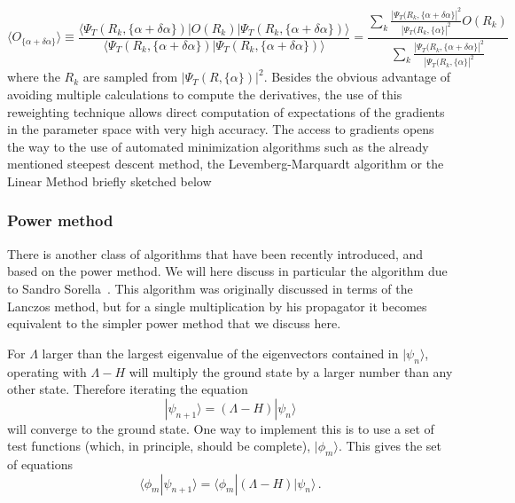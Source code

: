 \begin{equation}
\langle O_{\{\alpha+\delta\alpha\}}\rangle\equiv
\frac{\langle \Psi_T(R_k,\{\alpha+\delta\alpha\})|O(R_k)|\Psi_T(R_k,\{\alpha+\delta\alpha\})\rangle}{\langle \Psi_T(R_k,\{\alpha+\delta\alpha\})|\Psi_T(R_k,\{\alpha+\delta\alpha\})\rangle}=
\frac{\sum_k \frac{|\Psi_T(R_k,\{\alpha+\delta\alpha\}|^2}{|\Psi_T(R_k,\{\alpha\}|^2}O(R_k)}{\sum_k \frac{|\Psi_T(R_k,\{\alpha+\delta\alpha\}|^2}{|\Psi_T(R_k,\{\alpha\}|^2}}
\end{equation}
where the $R_k$ are sampled from $|\Psi_T(R,\{\alpha\})|^2$. Besides the obvious advantage of avoiding multiple calculations to compute the derivatives, the use of this reweighting technique allows direct computation of expectations of the gradients in the parameter space with very high accuracy. The access to gradients opens the way to the use of automated minimization algorithms such as the already mentioned steepest descent method, the Levemberg-Marquardt algorithm \cite{Cyrus96} or the Linear Method \cite{Toulouse07} briefly sketched below 

\subsubsection{Power method}
\label{sec:pm}
There is another class of algorithms that have been recently introduced, and based on the power method. We will here discuss in particular the algorithm due to Sandro Sorella~\cite{Sorella01}.
This algorithm was originally discussed in terms of
the Lanczos method, but for
a single multiplication by his propagator it
becomes equivalent to the simpler power method that we discuss here.

For $\Lambda$ larger than the largest eigenvalue of the
eigenvectors contained in $|\psi_n\rangle$, operating
with $\Lambda -H$ will multiply the ground state by a larger number
than any other state. Therefore iterating the equation
\begin{equation}
|\psi_{n+1}\rangle = (\Lambda-H)|\psi_n\rangle
\end{equation}
will converge to the ground state.
One way to implement this is to use a set of test functions (which, in
principle, should be complete), $|\phi_m\rangle$. This gives the
set of equations
\begin{equation}
\label{eq.power}
\langle \phi_m |\psi_{n+1}\rangle = \langle \phi_m |(\Lambda -H)|\psi_n\rangle
\,.
\end{equation}


